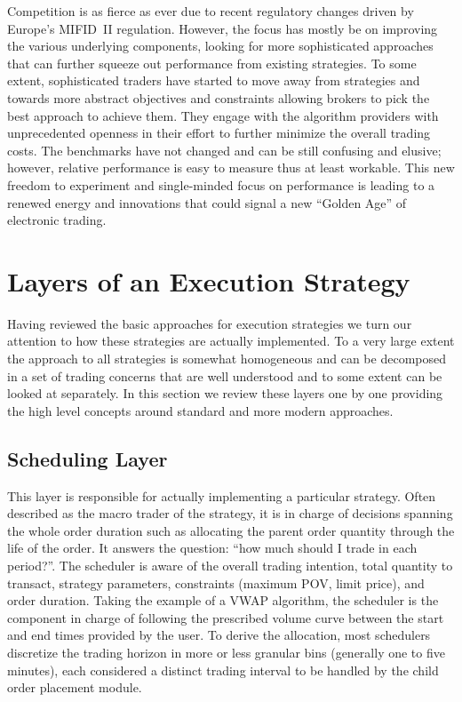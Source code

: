 Competition is as fierce as ever due to recent regulatory changes driven by Europe's MIFID~II regulation. However, the focus has mostly be on improving the various underlying components, looking for more sophisticated approaches that can further squeeze out performance from existing strategies. To some extent, sophisticated traders have started to move away from strategies and towards more abstract objectives and constraints allowing brokers to pick the best approach to achieve them. They engage with the algorithm providers with unprecedented openness in their effort to further minimize the overall trading costs. The benchmarks have not changed and can be still confusing and elusive; however, relative performance is easy to measure thus at least workable. This new freedom to experiment and single-minded focus on performance is leading to a renewed energy and innovations that could signal a new ``Golden Age'' of electronic trading.



\section{Layers of an Execution Strategy}

Having reviewed the basic approaches for execution strategies we turn our attention to how these strategies are actually implemented. To a very large extent the approach to all strategies is somewhat homogeneous and can be decomposed in a set of trading concerns that are well understood and to some extent can be looked at separately. In this section we review these layers one by one providing the high level concepts around standard and more modern approaches.


\subsection{Scheduling Layer}

This layer is responsible for actually implementing a particular strategy. Often described as the macro trader of the strategy, it is in charge of decisions spanning the whole order duration such as allocating the parent order quantity through the life of the order. It answers the question: ``how much should I trade in each period?''. The scheduler is aware of the overall trading intention, total quantity to transact, strategy parameters, constraints (maximum POV, limit price), and order duration. Taking the example of a VWAP algorithm, the scheduler is the component in charge of following the prescribed volume curve between the start and end times provided by the user. To derive the allocation, most schedulers discretize the trading horizon in more or less granular bins (generally one to five minutes), each considered a distinct trading interval to be handled by the child order placement module.


